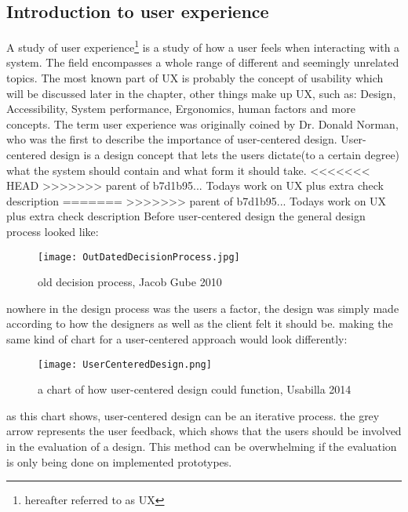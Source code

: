 \subsection{Introduction to user experience }
A study of user experience\footnote{hereafter referred to as UX} is a study of how a user feels when interacting with a system. The field encompasses a whole range of different and seemingly unrelated topics. The most known part of UX is probably the concept of usability which will be discussed later in the chapter, other things make up UX, such as: Design, Accessibility, System performance, Ergonomics, human factors and more concepts\cite{UXIntro}. The term user experience  was originally coined by Dr. Donald Norman, who was the first to describe the importance of user-centered design. User-centered design is a design concept that lets the users dictate(to a certain degree) what the system should contain and what form it should take.
<<<<<<< HEAD
>>>>>>> parent of b7d1b95... Todays work on UX plus extra check description
=======
>>>>>>> parent of b7d1b95... Todays work on UX plus extra check description
Before user-centered design the general design process looked like:
\begin{figure}[H]
\centering
\texttt{[image: OutDatedDecisionProcess.jpg]}
\caption{old decision process, Jacob Gube 2010}
\end{figure}
nowhere in the design process was the users a factor, the design was simply made according to how the designers as well as the client felt it should be. making the same kind of chart for a user-centered approach would look differently:\\
\begin{figure}[H]
\centering
\texttt{[image: UserCenteredDesign.png]}
\caption{a chart of how user-centered design could function, Usabilla 2014}
\end{figure}
as this chart shows, user-centered design can be an iterative process. the grey arrow represents the user feedback, which shows that the users should be involved in the evaluation of a design. This method can be overwhelming if the evaluation is only being done on implemented prototypes.


